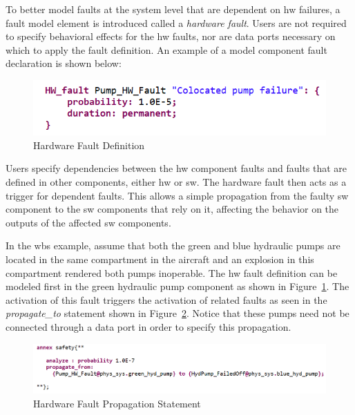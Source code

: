 To better model faults at the system level that are dependent on \gls{hw} failures, a fault model element is introduced called a \textit{hardware fault}. Users are not required to specify behavioral effects for the \gls{hw} faults, nor are data ports necessary on which to apply the fault definition. An example of a model component fault declaration is shown below:
\begin{figure}[h!]
	\vspace{-0.1in}
	\begin{center}
	\includegraphics[width=.6\textwidth]{images/hw_fault2.png}
	\end{center}
	\vspace{-0.3in}
	\caption{Hardware Fault Definition}
	\label{fig:hwFault}
	\vspace{-0.2in}
\end{figure}

Users specify dependencies between the \gls{hw} component faults and faults that are defined in other components, either \gls{hw} or \gls{sw}. The hardware fault then acts as a trigger for dependent faults. This allows a simple propagation from the faulty \gls{sw} component to the \gls{sw} components that rely on it, affecting the behavior on the outputs of the affected \gls{sw} components.

In the \gls{wbs} example, assume that both the green and blue hydraulic pumps are located in the same compartment in the aircraft and an explosion in this compartment rendered both pumps inoperable. The \gls{hw} fault definition can be modeled first in the green hydraulic pump component as shown in Figure~\ref{fig:hwFault}. The activation of this fault triggers the activation of related faults as seen in the \textit{propagate\_to} statement shown in Figure~\ref{fig:hwFaultProp}. Notice that these pumps need not be connected through a data port in order to specify this propagation. 

\begin{figure}[h!]
	\vspace{-0.1in}
	\begin{center}
		\includegraphics[width=1.0\textwidth]{images/hw_prop_stmt.png}
	\end{center}
	\vspace{-0.3in}
	\caption{Hardware Fault Propagation Statement}
	\label{fig:hwFaultProp}
\end{figure}

